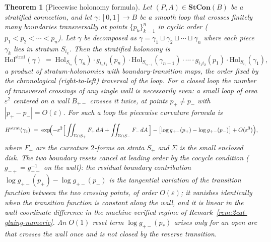 \documentclass[11pt,a4paper]{article}
\theoremstyle{plain}
\newtheorem{theorem}{Theorem}[section]
\theoremstyle{definition}
\theoremstyle{remark}
\begin{document}
\begin{theorem}[Piecewise holonomy formula]
\label{thm:stratified-holonomy}
Let $(P, A) \in \mathbf{StCon}(B)$ be a stratified connection, and let
$\gamma : [0, 1] \to B$ be a smooth loop that crosses finitely many
boundaries transversally at points $\{p_k\}_{k=1}^n$ in cyclic order
($p_1 < p_2 < \cdots < p_n$). Let $\gamma$ be decomposed as
$\gamma = \gamma_1 \sqcup \gamma_2 \sqcup \cdots \sqcup \gamma_n$
where each piece $\gamma_k$ lies in stratum $S_{i_k}$. Then the
stratified holonomy is
\begin{equation}\label{eq:strat-holonomy}
  \mathrm{Hol}^{\mathrm{strat}}(\gamma) \;=\;
  \mathrm{Hol}_{S_{i_n}}(\gamma_n) \cdot g_{i_n i_1}(p_n) \cdot
  \mathrm{Hol}_{S_{i_{n-1}}}(\gamma_{n-1}) \cdot \cdots \cdot
  g_{i_1 i_2}(p_1) \cdot \mathrm{Hol}_{S_{i_1}}(\gamma_1),
\end{equation}
a product of stratum-holonomies with boundary-transition maps, the
order fixed by the chronological (right-to-left) traversal of the
loop. For a \emph{closed} loop the number of transversal crossings of
any single wall is necessarily even: a small loop of area
$\varepsilon^2$ centered on a wall $B_{+-}$ crosses it twice, at
points $p_+ \neq p_-$ with $|p_+ - p_-| = O(\varepsilon)$. For such a
loop the piecewise curvature formula is
\begin{equation}\label{eq:piecewise-F}
  H^{\mathrm{strat}}(\gamma_\varepsilon) \;=\;
  \exp\!\Bigl(-\varepsilon^2\Bigl[\,\iint_{\Sigma \cap S_+} F_+\,
  dA + \iint_{\Sigma \cap S_-} F_-\, dA\,\Bigr]
  - \bigl[\log g_{+-}(p_+) - \log g_{+-}(p_-)\bigr]
  + O(\varepsilon^3)\Bigr),
\end{equation}
where $F_\pm$ are the curvature $2$-forms on strata $S_\pm$ and
$\Sigma$ is the small enclosed disk. The two boundary resets cancel
at leading order by the cocycle condition
($g_{-+} = g_{+-}^{-1}$ on the wall): the residual boundary
contribution $\log g_{+-}(p_+) - \log g_{+-}(p_-)$ is the
\emph{tangential variation} of the transition function between the
two crossing points, of order $O(\varepsilon)$; it vanishes identically
when the transition function is constant along the wall, and it is
linear in the wall-coordinate difference in the machine-verified
regime of Remark~\ref{rem:2cat-gluing-numeric}. An $O(1)$ reset term
$\log g_{+-}(p_*)$ arises only for an \emph{open arc} that crosses
the wall once and is not closed by the reverse transition.
\end{theorem}
\end{document}
